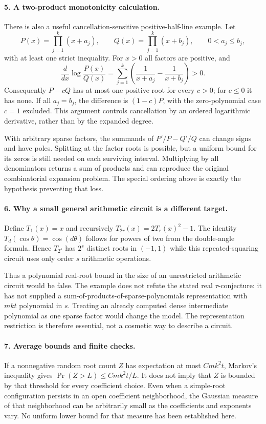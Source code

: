 \documentclass[11pt]{article}
\begin{document}
\paragraph{5. A two-product monotonicity calculation.}
There is also a useful cancellation-sensitive positive-half-line example. Let
\[
 P(x)=\prod_{j=1}^k(x+a_j),\qquad
 Q(x)=\prod_{j=1}^k(x+b_j),\qquad
 0<a_j\le b_j,
\]
with at least one strict inequality. For $x>0$ all factors are positive, and
\[
 \frac{d}{dx}\log\frac{P(x)}{Q(x)}
 =\sum_{j=1}^k\left(\frac1{x+a_j}-\frac1{x+b_j}\right)>0.
\]
Consequently $P-cQ$ has at most one positive root for every $c>0$; for $c\le0$ it has none. If all $a_j=b_j$, the difference is $(1-c)P$, with the zero-polynomial case $c=1$ excluded. This argument controls cancellation by an ordered logarithmic derivative, rather than by the expanded degree.

With arbitrary sparse factors, the summands of $P'/P-Q'/Q$ can change signs and have poles. Splitting at the factor roots is possible, but a uniform bound for its zeros is still needed on each surviving interval. Multiplying by all denominators returns a sum of products and can reproduce the original combinatorial expansion problem. The special ordering above is exactly the hypothesis preventing that loss.

\paragraph{6. Why a small general arithmetic circuit is a different target.}
Define $T_1(x)=x$ and recursively $T_{2r}(x)=2T_r(x)^2-1$. The identity $T_d(\cos\theta)=\cos(d\theta)$ follows for powers of two from the double-angle formula. Hence $T_{2^s}$ has $2^s$ distinct roots in $(-1,1)$ while this repeated-squaring circuit uses only order $s$ arithmetic operations.

Thus a polynomial real-root bound in the size of an unrestricted arithmetic circuit would be false. The example does not refute the stated real $\tau$-conjecture: it has not supplied a sum-of-products-of-sparse-polynomials representation with $mkt$ polynomial in $s$. Treating an already computed dense intermediate polynomial as one sparse factor would change the model. The representation restriction is therefore essential, not a cosmetic way to describe a circuit.

\paragraph{7. Average bounds and finite checks.}
If a nonnegative random root count $Z$ has expectation at most $Cmk^2t$, Markov's inequality gives $\Pr(Z>L)\le Cmk^2t/L$. It does not imply that $Z$ is bounded by that threshold for every coefficient choice. Even when a simple-root configuration persists in an open coefficient neighborhood, the Gaussian measure of that neighborhood can be arbitrarily small as the coefficients and exponents vary. No uniform lower bound for that measure has been established here.
\end{document}
